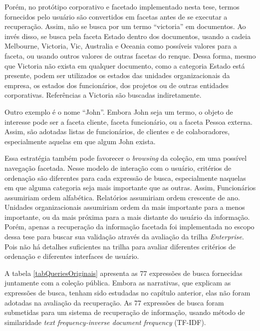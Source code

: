 Porém, no protótipo corporativo e facetado implementado nesta tese, termos fornecidos pelo usuário são convertidos em facetas antes de se executar a recuperação. Assim, não se busca por um termo ``victoria'' em documentos. Ao invés disso, se busca pela faceta Estado dentro dos documentos, usando a cadeia Melbourne, Victoria, Vic, Australia e Oceania como possíveis valores para a faceta, ou usando outros valores de outras facetas do renque.
Dessa forma, mesmo que Victoria não exista em qualquer documento, como a categoria Estado está presente, podem ser utilizados os estados das unidades organizacionais da empresa, os estados dos funcionários, dos projetos ou de outras entidades corporativas. Referências a Victoria são buscadas indiretamente.

Outro exemplo é o nome ``John''. Embora John seja um termo, o objeto de interesse pode ser a faceta cliente, faceta funcionário, ou a faceta Pessoa externa. Assim, são adotadas listas de funcionários, de clientes e de colaboradores, especialmente aquelas em que algum John exista. 

Essa estratégia também pode favorecer o \textit{browsing}  da coleção, em uma possível navegação facetada. Nesse modelo de interação com o usuário, critérios de ordenação são diferentes para cada expressão de busca, especialmente naquelas em que alguma categoria seja mais importante que as outras. Assim, Funcionários assumiriam ordem alfabética. Relatórios assumiriam ordem crescente de ano. Unidades organizacionais assumiriam ordem da mais importante para a menos importante, ou da mais próxima para a mais distante do usuário da informação. Porém, apenas a recuperação da informação facetada foi implementada no escopo dessa tese para buscar sua validação através da avaliação da trilha \textit{Enterprise}. Pois não há detalhes suficientes na trilha para avaliar diferentes critérios de ordenação e diferentes interfaces de usuário.


A tabela \ref{tabQueriesOriginais} apresenta as 77 expressões de busca fornecidas juntamente com a coleção pública. Embora as narrativas, que explicam as expressões de busca, tenham sido estudadas no capítulo anterior, elas não foram adotadas na avaliação da recuperação. As 77 expressões de busca foram submetidas para um sistema de recuperação de informação, usando método de similaridade \textit{text frequency-inverse document frequency} (TF-IDF).

